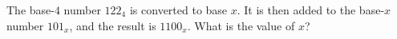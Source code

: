 The base-$4$ number $122_4$ is converted to base $x$. It is then added to the base-$x$ number $101_x$, and the result is $1100_x$. What is the value of $x$?
